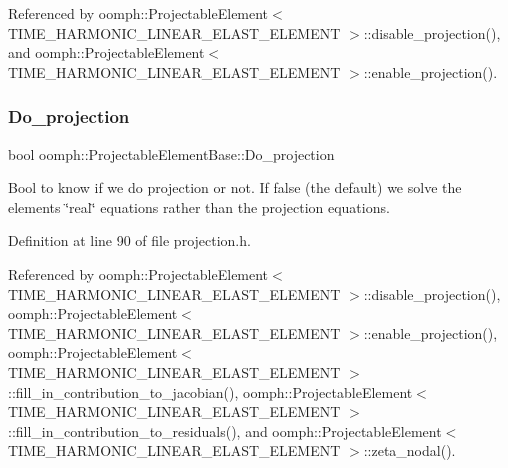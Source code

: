 Referenced by oomph\+::\+Projectable\+Element$<$ T\+I\+M\+E\+\_\+\+H\+A\+R\+M\+O\+N\+I\+C\+\_\+\+L\+I\+N\+E\+A\+R\+\_\+\+E\+L\+A\+S\+T\+\_\+\+E\+L\+E\+M\+E\+N\+T $>$\+::disable\+\_\+projection(), and oomph\+::\+Projectable\+Element$<$ T\+I\+M\+E\+\_\+\+H\+A\+R\+M\+O\+N\+I\+C\+\_\+\+L\+I\+N\+E\+A\+R\+\_\+\+E\+L\+A\+S\+T\+\_\+\+E\+L\+E\+M\+E\+N\+T $>$\+::enable\+\_\+projection().

\mbox{\label{classoomph_1_1ProjectableElementBase_a8e6db97455edb38611347e258593f592}} 
\subsubsection{\texorpdfstring{Do\+\_\+projection}{Do\_projection}}
{\footnotesize\ttfamily bool oomph\+::\+Projectable\+Element\+Base\+::\+Do\+\_\+projection\hspace{0.3cm}{\ttfamily [protected]}}



Bool to know if we do projection or not. If false (the default) we solve the element\textquotesingle{}s \char`\"{}real\char`\"{} equations rather than the projection equations. 



Definition at line 90 of file projection.\+h.



Referenced by oomph\+::\+Projectable\+Element$<$ T\+I\+M\+E\+\_\+\+H\+A\+R\+M\+O\+N\+I\+C\+\_\+\+L\+I\+N\+E\+A\+R\+\_\+\+E\+L\+A\+S\+T\+\_\+\+E\+L\+E\+M\+E\+N\+T $>$\+::disable\+\_\+projection(), oomph\+::\+Projectable\+Element$<$ T\+I\+M\+E\+\_\+\+H\+A\+R\+M\+O\+N\+I\+C\+\_\+\+L\+I\+N\+E\+A\+R\+\_\+\+E\+L\+A\+S\+T\+\_\+\+E\+L\+E\+M\+E\+N\+T $>$\+::enable\+\_\+projection(), oomph\+::\+Projectable\+Element$<$ T\+I\+M\+E\+\_\+\+H\+A\+R\+M\+O\+N\+I\+C\+\_\+\+L\+I\+N\+E\+A\+R\+\_\+\+E\+L\+A\+S\+T\+\_\+\+E\+L\+E\+M\+E\+N\+T $>$\+::fill\+\_\+in\+\_\+contribution\+\_\+to\+\_\+jacobian(), oomph\+::\+Projectable\+Element$<$ T\+I\+M\+E\+\_\+\+H\+A\+R\+M\+O\+N\+I\+C\+\_\+\+L\+I\+N\+E\+A\+R\+\_\+\+E\+L\+A\+S\+T\+\_\+\+E\+L\+E\+M\+E\+N\+T $>$\+::fill\+\_\+in\+\_\+contribution\+\_\+to\+\_\+residuals(), and oomph\+::\+Projectable\+Element$<$ T\+I\+M\+E\+\_\+\+H\+A\+R\+M\+O\+N\+I\+C\+\_\+\+L\+I\+N\+E\+A\+R\+\_\+\+E\+L\+A\+S\+T\+\_\+\+E\+L\+E\+M\+E\+N\+T $>$\+::zeta\+\_\+nodal().


